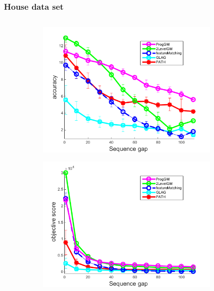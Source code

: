 \documentclass[hyperref={pdfpagelabels=false}]{beamer}
\begin{document}
\begin{frame} %
\frametitle{House data set}

\begin{minipage}[0.2\textheight]{\textwidth}
	\begin{columns}[T]
		\begin{column}{0.7\textwidth}

			\begin{figure}[h] \centering
					\begin{subfigure}[b]{0.32\textwidth}
						\centering
						\includegraphics[scale=0.12]{"fig/evaluation/HouseSeq2/anchor_descr/using_cpd_afftrafo/solution2/performance/accuracy"} 
					\end{subfigure} 
					\begin{subfigure}[b]{0.32\textwidth}
						\centering
						\includegraphics[scale=0.12]{"fig/evaluation/HouseSeq2/anchor_descr/using_cpd_afftrafo/solution2/performance/score"} 

\end{subfigure}
\end{figure}
\end{column}
\end{columns}
\end{minipage}
\end{frame}
\end{document}
